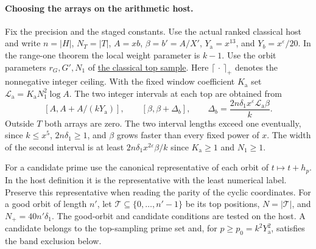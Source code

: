 \paragraph{Choosing the arrays on the arithmetic host.}
%
Fix the precision and the staged constants. Use the actual ranked
classical host and write \(n=|H|\), \(N_T=|T|\), \(A=xb\),
\(\beta=b'=A/X'\), \(Y_{\mathrm a}=x^{13}\), and \(Y_b=x^\varepsilon/20\).
In the range-one theorem the local weight parameter is \(k-1\).
Use the orbit parameters \(r_G,G',N_1\) of
\hyperlink{proof.classical-top-sample}{the classical top sample}.
Here \(\lceil\,\cdot\,\rceil_+\) denotes the nonnegative integer
ceiling.
With the fixed window coefficient \(K_{\mathrm a}\) set
\(\mathcal L_{\mathrm a}=K_{\mathrm a}N_1^2\log A\).
The two integer intervals at each top are obtained from
\[
 [A,A+A/(kY_{\mathrm a})],\qquad [\beta,\beta+\Delta_b],
 \qquad
 \Delta_b=\frac{2n\delta_1x^\varepsilon\mathcal L_{\mathrm a}\beta}{k}.
\]
Outside \(T\) both arrays are zero. The two interval lengths
exceed one eventually, since \(k\le x^5\),
\(2n\delta_1\ge1\), and \(\beta\) grows faster than every fixed
power of \(x\). The width of the second interval is at least
\(2n\delta_1 x^{2\varepsilon}\beta/k\) since \(K_{\mathrm a}\ge1\)
and \(N_1\ge1\).

\leavevmode{}%
For a candidate prime use the canonical representative of each orbit
of \(t\mapsto t+h_p\). In the host definition it is the representative
with the least numerical label. Preserve this representative when
reading the parity of the cyclic coordinates. For a good orbit of
length \(n'\), let \(\mathcal T\subseteq\{0,\dots,n'-1\}\) be its
top positions, \(N=|\mathcal T|\), and \(N_+=40n'\delta_1\).
The good-orbit and candidate conditions are tested on the host.
A candidate belongs to the top-sampling prime set and, for
\(p\ge p_0=k^2Y_{\mathrm a}^2\), satisfies the band exclusion below.


